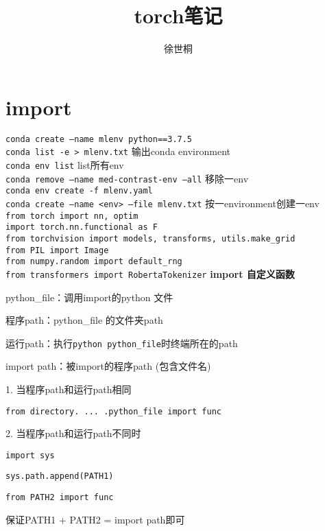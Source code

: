 \documentclass[UTF8]{ctexart}
\title{torch笔记}
\author{徐世桐}
\date{}
\begin{document}
\maketitle

\section{import}
\noindent \texttt{conda create --name mlenv python==3.7.5}\\
\texttt{conda list -e > mlenv.txt} 输出conda environment\\
\texttt{conda env list} list所有env\\
\texttt{conda remove --name med-contrast-env --all} 移除一env\\
\texttt{conda env create -f mlenv.yaml}\\
\texttt{conda create --name <env> --file mlenv.txt} 按一environment创建一env\\
\texttt{from torch import nn, optim}\\
\texttt{import torch.nn.functional as F}\\
\texttt{from torchvision import models, transforms, utils.make\_grid}\\
\texttt{from PIL import Image}\\
\texttt{from numpy.random import default\_rng}\\
\texttt{from transformers import RobertaTokenizer}
\textbf{import 自定义函数}

  python\_file：调用import的python 文件

  程序path：python\_file 的文件夹path

  运行path：执行\texttt{python python\_file}时终端所在的path

  import path：被import的程序path (包含文件名)

  1. 当程序path和运行path相同

  \quad \texttt{from directory. ... .python\_file import func}

  2. 当程序path和运行path不同时

  \quad \texttt{import sys}

  \quad \texttt{sys.path.append(PATH1)}

  \quad \texttt{from PATH2 import func}

  \quad \quad 保证PATH1 + PATH2 = import path即可
\end{document}
